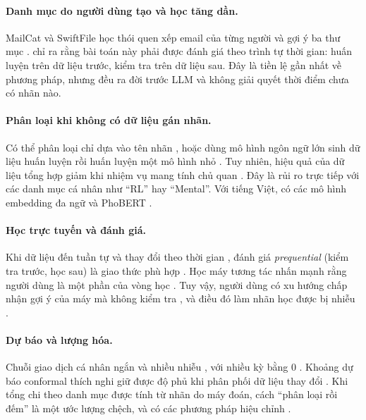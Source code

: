 \documentclass[12pt,a4paper]{article}
\begin{document}
\paragraph{Danh mục do người dùng tạo và học tăng dần.} MailCat và SwiftFile học thói quen xếp email của từng người và gợi ý ba thư mục \citep{segal1999mailcat}. \citet{bekkerman2004email} chỉ ra rằng bài toán này phải được đánh giá theo trình tự thời gian: huấn luyện trên dữ liệu trước, kiểm tra trên dữ liệu sau. Đây là tiền lệ gần nhất về phương pháp, nhưng đều ra đời trước LLM và không giải quyết thời điểm chưa có nhãn nào.

\paragraph{Phân loại khi không có dữ liệu gán nhãn.} Có thể phân loại chỉ dựa vào tên nhãn \citep{meng2020lotclass}, hoặc dùng mô hình ngôn ngữ lớn sinh dữ liệu huấn luyện rồi huấn luyện một mô hình nhỏ \citep{schick2021generating,ye2022zerogen}. Tuy nhiên, hiệu quả của dữ liệu tổng hợp giảm khi nhiệm vụ mang tính chủ quan \citep{li2023synthetic}. Đây là rủi ro trực tiếp với các danh mục cá nhân như ``RL'' hay ``Mental''. Với tiếng Việt, có các mô hình embedding đa ngữ \citep{chen2024bgem3,wang2024me5} và PhoBERT \citep{nguyen2020phobert}.

\paragraph{Học trực tuyến và đánh giá.} Khi dữ liệu đến tuần tự và thay đổi theo thời gian \citep{gama2014survey,lu2019drift}, đánh giá \emph{prequential} (kiểm tra trước, học sau) là giao thức phù hợp \citep{dawid1984prequential,gama2013evaluating}. Học máy tương tác nhấn mạnh rằng người dùng là một phần của vòng học \citep{amershi2014power}. Tuy vậy, người dùng có xu hướng chấp nhận gợi ý của máy mà không kiểm tra \citep{parasuraman2010complacency}, và điều đó làm nhãn học được bị nhiễu \citep{song2022noisy}.

\paragraph{Dự báo và lượng hóa.} Chuỗi giao dịch cá nhân ngắn và nhiều nhiễu \citep{brando2018uncertainty}, với nhiều kỳ bằng 0 \citep{croston1972,teunter2011tsb}. Khoảng dự báo conformal thích nghi giữ được độ phủ khi phân phối dữ liệu thay đổi \citep{gibbs2021aci,xu2021enbpi}. Khi tổng chi theo danh mục được tính từ nhãn do máy đoán, cách ``phân loại rồi đếm'' là một ước lượng chệch, và có các phương pháp hiệu chỉnh \citep{forman2008quantifying}.
\end{document}
